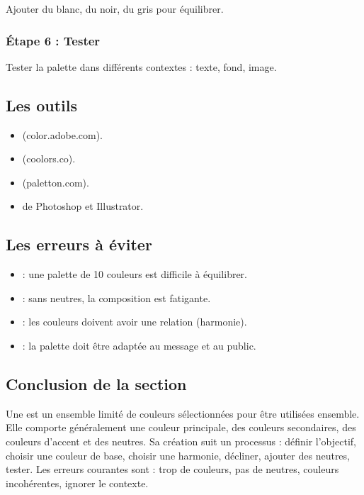 Ajouter du blanc, du noir, du gris pour équilibrer.

\subsubsection{Étape 6 : Tester}

Tester la palette dans différents contextes : texte, fond, image.

\subsection{Les outils}

\begin{itemize}
    \item {} (color.adobe.com).
    \item {} (coolors.co).
    \item {} (paletton.com).
    \item {} de Photoshop et Illustrator.
\end{itemize}

\subsection{Les erreurs à éviter}

\begin{itemize}
    \item {} : une palette de 10 couleurs est difficile à équilibrer.
    \item {} : sans neutres, la composition est fatigante.
    \item {} : les couleurs doivent avoir une relation (harmonie).
    \item {} : la palette doit être adaptée au message et au public.
\end{itemize}

\subsection*{Conclusion de la section}

\begin{retenir}
Une  est un ensemble limité de couleurs sélectionnées pour être utilisées ensemble. Elle comporte généralement une couleur principale, des couleurs secondaires, des couleurs d'accent et des neutres. Sa création suit un processus : définir l'objectif, choisir une couleur de base, choisir une harmonie, décliner, ajouter des neutres, tester. Les erreurs courantes sont : trop de couleurs, pas de neutres, couleurs incohérentes, ignorer le contexte.
\end{retenir}

